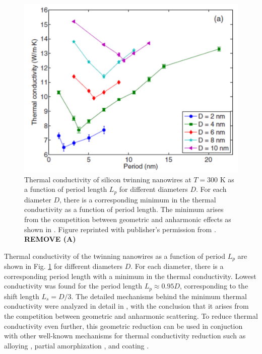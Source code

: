 \begin{figure}[tb]
 \begin{center}
  \includegraphics[width=.89\columnwidth]{pics/twinning_fig2a.pdf} 
  \caption{Thermal conductivity of silicon twinning nanowires at $T=300$ K as a function of period length $L_p$ for different diameters $D$. For each diameter $D$, there is a corresponding minimum in the thermal conductivity as a function of period length. The minimum arises from the competition between geometric and anharmonic effects as shown in . Figure reprinted with publisher's permission from . \textbf{REMOVE (A)}}  
\label{fig:twinning_fig2}
 \end{center}
\end{figure}

Thermal conductivity of the twinning nanowires as a function of period $L_p$ are shown in Fig. \ref{fig:twinning_fig2} for different diameters $D$. For each diameter, there is a corresponding period length with a minimum in the thermal conductivity. Lowest conductivity was found for the period length $L_p\approx 0.95D$, corresponding to the shift length $L_s=D/3$. The detailed mechanisms behind the minimum thermal conductivity were analyzed in detail in , with the conclusion that it arises from the competition between geometric and anharmonic scattering. To reduce thermal conductivity even further, this geometric reduction can be used in conjuction with other well-known mechanisms for thermal conductivity reduction such as alloying \cite{}, partial amorphization \cite{}, and coating \cite{}. %

